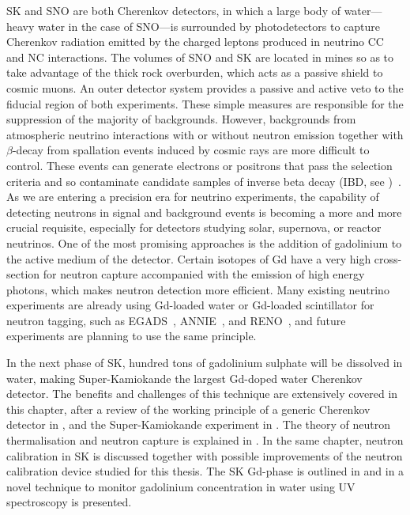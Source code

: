 SK and SNO are both Cherenkov detectors, in which a large body of water---heavy water in the case of SNO---is surrounded by %
photodetectors to capture Cherenkov radiation emitted by the charged leptons produced in neutrino CC and NC interactions.
The volumes of SNO and SK are located in mines so as to take advantage of the thick rock overburden, %
which acts as a passive shield to cosmic muons.
An outer detector system provides a passive and active veto to the fiducial region of both experiments.
These simple measures are responsible for the suppression of the majority of backgrounds.
However, backgrounds from atmospheric neutrino interactions with or without neutron emission together %
with $\beta$-decay from spallation events induced by cosmic rays are more difficult to control.
These events can generate electrons or positrons that pass the selection criteria and so contaminate %
candidate samples of inverse beta decay (IBD, see )~\cite{Zhang:2013tua, Super-Kamiokande:2015xra}.
As we are entering a precision era for neutrino experiments, the capability of detecting neutrons %
in signal and background events is becoming a more and more crucial requisite, %
especially for detectors studying solar, supernova, or reactor neutrinos.
One of the most promising approaches is the addition of gadolinium to the active medium of the detector.
Certain isotopes of Gd have a very high cross-section for neutron capture %
accompanied with the emission of high energy photons, which makes neutron detection more efficient.
Many existing neutrino experiments are already using Gd-loaded water or Gd-loaded scintillator for neutron tagging, %
such as EGADS~\cite{Ikeda:2019pcm}, ANNIE~\cite{Back:2019aqi}, and RENO~\cite{Ahn:2010vy}, %
and future experiments are planning to use the same principle.

In the next phase of SK, hundred tons of gadolinium sulphate will be dissolved in water, making %
Super-Kamiokande the largest Gd-doped water Cherenkov detector.	%
The benefits and challenges of this technique are extensively covered in this chapter, %
after a review of the working principle of a generic Cherenkov detector in , %
and the Super-Kamiokande experiment in .
The theory of neutron thermalisation and neutron capture is explained in .
In the same chapter, neutron calibration in SK is discussed together with %
possible improvements of the neutron calibration device studied for this thesis.
The SK Gd-phase is outlined in  and in  %
a novel technique to monitor gadolinium concentration in water using UV spectroscopy is presented.

